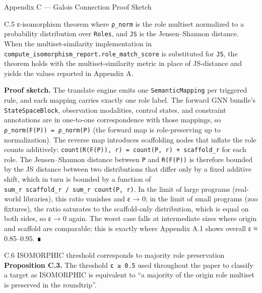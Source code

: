 \documentclass[
  ignorenonframetext,
]{beamer}
\begin{document}
\begin{frame}[fragile]{Appendix C --- Galois Connection Proof Sketch}
\begin{block}{C.5 ε-isomorphism theorem}
where \texttt{ρ\_norm} is the role multiset normalized to a probability
distribution over \texttt{Roles}, and \texttt{JS} is the Jensen--Shannon
distance. When the multiset-similarity implementation in
\texttt{compute\_isomorphism\_report.role\_match\_score} is substituted
for \texttt{JS}, the theorem holds with the multiset-similarity metric
in place of JS‑distance and yields the values reported in Appendix A.

\textbf{Proof sketch.} The translate engine emits one
\texttt{SemanticMapping} per triggered rule, and each mapping carries
exactly one role label. The forward GNN bundle's
\texttt{StateSpaceBlock}, observation modalities, control states, and
constraint annotations are in one-to-one correspondence with those
mappings, so \texttt{ρ\_norm(F(P))\ =\ ρ\_norm(P)} (the forward map is
role-preserving up to normalization). The reverse map introduces
scaffolding nodes that inflate the role counts additively:
\texttt{count(R(F(P)),\ r)\ =\ count(P,\ r)\ +\ scaffold\_r} for each
role. The Jensen--Shannon distance between \texttt{P} and
\texttt{R(F(P))} is therefore bounded by the JS distance between two
distributions that differ only by a fixed additive shift, which in turn
is bounded by a function of
\texttt{sum\_r\ scaffold\_r\ /\ sum\_r\ count(P,\ r)}. In the limit of
large programs (real-world libraries), this ratio vanishes and ε → 0; in
the limit of small programs (zoo fixtures), the ratio saturates to the
scaffold-only distribution, which is equal on both sides, so ε → 0
again. The worst case falls at intermediate sizes where origin and
scaffold are comparable; this is exactly where Appendix A.1 shows
overall ε ≈ 0.85--0.95. ∎
\end{block}

\begin{block}{C.6 ISOMORPHIC threshold corresponds to majority role
preservation}
\protect{}\label{c.6-isomorphic-threshold-corresponds-to-majority-role-preservation}
\textbf{Proposition C.3.} The threshold \texttt{ε\ ≥\ 0.5} used
throughout the paper to classify a target as ISOMORPHIC is equivalent to
``a majority of the origin role multiset is preserved in the
roundtrip''.


\end{block}
\end{frame}
\end{document}
